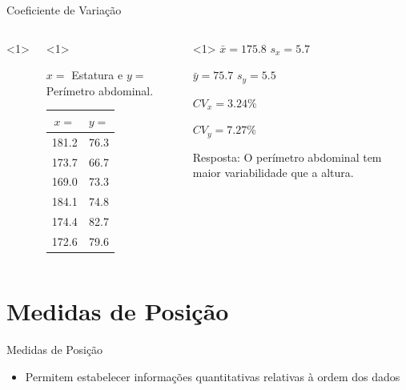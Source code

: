 \documentclass{beamer}
\begin{document}
\begin{frame}{Coeficiente de Variação}
  \begin{example}
    \begin{columns}<1>
      \begin{column}{5cm}<1>

        $x=$ Estatura e $y=$ Perímetro abdominal.

        \begin{tabular}{cc}
          $x=$ &$y=$\\
          \hline
          181.2 &76.3\\
          173.7&66.7\\
          169.0&73.3\\
          184.1&74.8\\
          174.4&82.7\\
          172.6&79.6\\
        \end{tabular}
      \end{column}
      \begin{column}{5cm}<1>
        $\bar{x} = 175.8$
        $s_x = 5.7$

        $\bar{y} = 75.7$
        $s_y = 5.5$

        \alert{$CV_x = %
          3.24\%$}

        \alert{$CV_y = %
          7.27\%$}

        Resposta: O perímetro abdominal tem maior variabilidade que a
        altura.
      \end{column}
    \end{columns}
  \end{example}

\end{frame}

\section{Medidas de Posição}

\begin{frame}{Medidas de Posição}
  \begin{itemize}
  \item Permitem estabelecer informações quantitativas relativas à
    ordem dos dados
  \end{itemize}
\end{frame}
\end{document}

